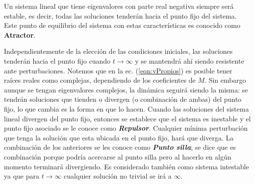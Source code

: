 \begin{proposición}\label{prp:Atractores}
	Un sistema lineal que tiene eigenvalores con parte real negativa siempre será estable, es decir, todas las soluciones tenderán hacia el punto fijo del sistema. Este punto de equilibrio del sistema con estas características es conocido como \textbf{Atractor}.
\end{proposición}
Independientemente de la elección de las condiciones iniciales, las soluciones tenderán hacia el punto fijo cuando $t\to\infty$ y se mantendrá ahí siendo resistente ante perturbaciones. Notemos que en la ec. (\ref{eqn:vPropios}) es posible tener raíces reales como complejas, dependiendo de los coeficientes de $M$. Sin embargo aunque se tengan eigenvalores complejos, la dinámica seguirá siendo la misma: se tendrán soluciones que tienden o divergen (o combinación de ambas) del punto fijo, lo que cambia es la forma en que lo hacen. Cuando las soluciones del sistema lineal divergen del punto fijo, entonces se establece que el sistema es inestable y el punto fijo asociado se le conoce como \textbf{\textit{Repulsor}}. Cualquier mínima perturbación que tenga la solución que esta ubicada en el punto fijo, hará que diverga. La combinación de los anteriores se les conoce como \textbf{\textit{Punto silla}}; se dice que es combinación porque podría acercarse al punto silla pero al hacerlo en algún momento terminará divergiendo. Es considerado también como sistema intestable ya que para $t\to\infty$ cualquier solución no trivial se irá a $\infty$.
